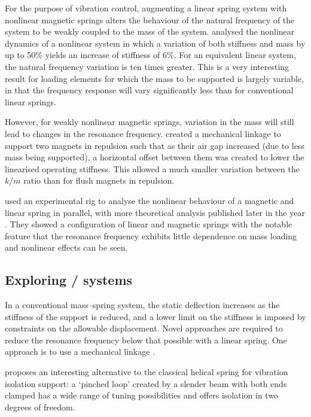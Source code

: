 For the purpose of vibration control, augmenting a linear spring system with nonlinear magnetic springs alters the behaviour of the natural frequency of the system to be weakly coupled to the mass of the system.
\textcite{dangola2006} analysed the nonlinear dynamics of a nonlinear system in which a variation of both stiffness and mass by up to 50\% yields an increase of stiffness of 6\%.
For an equivalent linear system, the natural frequency variation is ten times greater.
This is a very interesting result for loading elements for which the mass to be supported is largely variable, in that the frequency response will vary significantly less than for conventional linear springs.

However, for weakly nonlinear magnetic springs, variation in the mass will still lead to changes in the resonance frequency.
\textcite{todaka2001} created a mechanical linkage to support two magnets in repulsion such that as their air gap increased (due to less mass being supported), a horizontal offset between them was created to lower the linearised operating stiffness.
This allowed a much smaller variation between the $k/m$ ratio than for flush magnets in repulsion.

\textcite{bonisoli2007-mssp} used an experimental rig to analyse the nonlinear behaviour of a magnetic and linear spring in parallel, with more theoretical analysis published later in the year \cite{bonisoli2007-mrc}.
They showed a configuration of linear and magnetic springs with the notable feature that the resonance frequency exhibits little dependence on mass loading and nonlinear effects can be seen.




\subsection{Exploring \qzs/ systems}

In a conventional mass--spring system, the static deflection increases as the stiffness of the support is reduced, and a lower limit on the stiffness is imposed by constraints on the allowable displacement.
Novel approaches are required to reduce the resonance frequency below that possible with a linear spring.
One approach is to use a mechanical linkage \cite{winterflood2001}.

\textcite{virgin2008} proposes an interesting alternative to the classical helical spring for vibration isolation support: a `pinched loop' created by a slender beam with both ends clamped has a wide range of tuning possibilities and offers isolation in two degrees of freedom.

